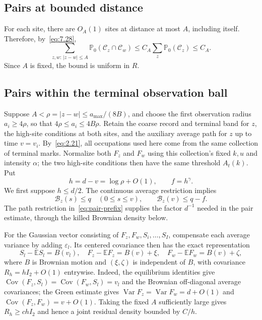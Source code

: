 \documentclass[11pt,a4paper]{article}
\numberwithin{equation}{section}
\theoremstyle{remark}
\DeclareMathOperator{\Var}{Var}
\DeclareMathOperator{\Cov}{Cov}
\begin{document}
\subsection{Pairs at bounded distance}\label{sec:neighbors}
For each site, there are $O_A(1)$ sites at distance at most $A$, including itself. Therefore, by~\eqref{eq:7.28},
\begin{equation}\label{eq:9.1}
\sum_{z,w:\,|z-w|\le A}
\mathbb P_0(\mathcal C_z\cap\mathcal C_w)
\le C_A\sum_z\mathbb P_0(\mathcal C_z)\le C_A.
\end{equation}
Since $A$ is fixed, the bound is uniform in $R$.

\subsection{Pairs within the terminal observation ball}\label{sec:latepairs}
Suppose $A<\rho=|z-w|\le a_{\max}/(8B)$, and choose the first observation radius $a_i\ge4\rho$, so that $4\rho\le a_i\le4B\rho$. Retain the coarse record and terminal band for $z$, the high-site conditions at both sites, and the auxiliary average path for $z$ up to time $v=v_i$. By~\eqref{eq:2.21}, all occupations used here come from the same collection of terminal marks. Normalize both $F_z$ and $F_w$ using this collection's fixed $k,u$ and intensity $\alpha$; the two high-site conditions then have the same threshold $A_t(k)$. Put
\[
 h=d-v=\log\rho+O(1),\qquad f=h^\gamma.
\]
We first suppose $h\le d/2$. The continuous average restriction implies
\begin{equation}\label{eq:pair-prefix}
 \mathcal B_z(s)\le q\quad(0\le s\le v),\qquad
 \mathcal B_z(v)\le q-f.
\end{equation}
The path restriction in~\eqref{eq:pair-prefix} supplies the factor $d^{-1}$ needed in the pair estimate, through the killed Brownian density below.

For the Gaussian vector consisting of $F_z,F_w,S_i,\ldots,S_I$, compensate each average variance by adding $\varepsilon_l$. Its centered covariance then has the exact representation
\begin{equation}\label{eq:pair-brownian}
 S_l-\mathbb ES_l=B(v_l),\quad
 F_z-\mathbb EF_z=B(v)+\xi,\quad
 F_w-\mathbb EF_w=B(v)+\zeta,
\end{equation}
where $B$ is Brownian motion and $(\xi,\zeta)$ is independent of $B$, with covariance $R_h=hI_2+O(1)$ entrywise. Indeed, the equilibrium identities give $\Cov(F_z,S_l)=\Cov(F_w,S_l)=v_l$ and the Brownian off-diagonal average covariances; the Green estimate gives $\Var F_z=\Var F_w=d+O(1)$ and $\Cov(F_z,F_w)=v+O(1)$. Taking the fixed $A$ sufficiently large gives $R_h\ge chI_2$ and hence a joint residual density bounded by $C/h$.
\end{document}
